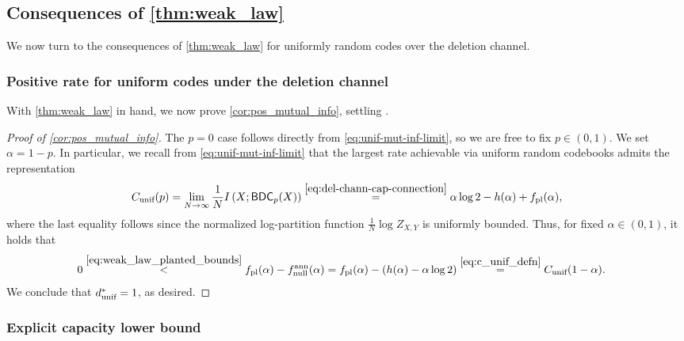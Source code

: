 \documentclass[11pt]{amsart}
\numberwithin{equation}{section}
\numberwithin{equation}{section}
\newcommand{\1}{\mathbbm{1}}
\newcommand{\unif}{\textup{unif}}
\newcommand{\BDC}{\textup{\textsf{BDC}}}
\newcommand{\fpl}{f_{\mathrm{pl}}}
\newcommand{\fnullann}{f_{\mathrm{null}}^{\mathrm{ann}}}
\theoremstyle{definition}
\begin{document}
\subsection{\texorpdfstring{Consequences of \cref{thm:weak_law}}{Consequences of Theorem \ref{thm:weak_law}}}

We now turn to the consequences of \cref{thm:weak_law} for uniformly random codes over the deletion channel.

\subsubsection{Positive rate for uniform codes under the deletion channel} \label{sec:coding_applications}

With \cref{thm:weak_law} in hand, we now prove \cref{cor:pos_mutual_info}, settling \cite[Conjecture 3]{pernice2024mutual}.

\begin{proof}[Proof of \cref{cor:pos_mutual_info}]
    The $p=0$ case follows directly from \eqref{eq:unif-mut-inf-limit}, so we are free to fix $p \in (0,1)$. We set $\alpha = 1-p$. In particular, we recall from \eqref{eq:unif-mut-inf-limit} that the largest rate achievable via uniform random codebooks admits the representation
    \begin{align} \label{eq:c_unif_defn}
        C_{\unif}(p) = \lim_{N \to \infty} \frac{1}{N} I\left( X; \BDC_p(X) \right) \stackrel{\eqref{eq:del-chann-cap-connection}}{=} \alpha \log 2 - h(\alpha) + \fpl(\alpha),
    \end{align}
    where the last equality follows since the normalized log-partition function $\frac{1}{N}\log Z_{X,Y}$ is uniformly bounded. Thus, for fixed $\alpha \in (0,1)$, it holds that
    \begin{align}
        0 & \stackrel{\eqref{eq:weak_law_planted_bounds}}{<} \fpl(\alpha) - \fnullann(\alpha) = \fpl(\alpha) - \left( h(\alpha) - \alpha\log 2 \right) \stackrel{\eqref{eq:c_unif_defn}}{=} C_{\unif}(1-\alpha). \label{eq:C_unif_positivity}
    \end{align}
    We conclude that $d_\unif^* = 1$, as desired.
\end{proof}

\subsubsection{Explicit capacity lower bound} \label{sec:numerics}
\end{document}
